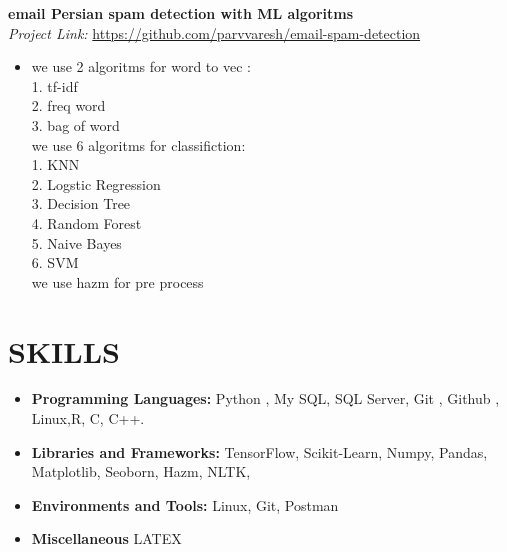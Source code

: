 \documentclass[a4paper,9pt]{extarticle}
\begin{document}
\textbf{email Persian spam detection with ML algoritms} \hfill \\ %
\textit{Project Link:} \url{https://github.com/parvvaresh/email-spam-detection} \hfill 
\begin{itemize}
    \item we use 2 algoritms for word to vec :\\

            1.  tf-idf\\
            2.  freq word\\
            3.  bag of word\\
            we use 6 algoritms for classifiction:\\
            
            1.  KNN\\
            2.  Logstic Regression\\
            3.  Decision Tree\\
            4.  Random Forest\\
            5.  Naive Bayes\\
            6.  SVM\\
            we use hazm for pre process
\end{itemize}




\section*{SKILLS}
\begin{itemize}
    \item \textbf{Programming Languages:} Python , My SQL, SQL Server, Git , Github , Linux,R, C, C++. %
    \item \textbf{Libraries and Frameworks:} TensorFlow, Scikit-Learn, Numpy, Pandas, Matplotlib, Seoborn, Hazm, NLTK,  %
    \item \textbf{Environments and Tools:} Linux, Git, Postman %
    \item \textbf{Miscellaneous} LATEX %


\end{itemize}

\end{document}
